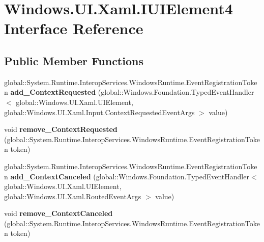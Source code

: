 \hypertarget{interface_windows_1_1_u_i_1_1_xaml_1_1_i_u_i_element4}{}\section{Windows.\+U\+I.\+Xaml.\+I\+U\+I\+Element4 Interface Reference}
\label{interface_windows_1_1_u_i_1_1_xaml_1_1_i_u_i_element4}
\subsection*{Public Member Functions}
\begin{DoxyCompactItemize}
\item 
\mbox{\label{interface_windows_1_1_u_i_1_1_xaml_1_1_i_u_i_element4_abe904f042597f814b0e82b6911018524}} 
global\+::\+System.\+Runtime.\+Interop\+Services.\+Windows\+Runtime.\+Event\+Registration\+Token {\bfseries add\+\_\+\+Context\+Requested} (global\+::\+Windows.\+Foundation.\+Typed\+Event\+Handler$<$ global\+::\+Windows.\+U\+I.\+Xaml.\+U\+I\+Element, global\+::\+Windows.\+U\+I.\+Xaml.\+Input.\+Context\+Requested\+Event\+Args $>$ value)
\item 
\mbox{\label{interface_windows_1_1_u_i_1_1_xaml_1_1_i_u_i_element4_abdaa8213b321663c768808ee50570eb8}} 
void {\bfseries remove\+\_\+\+Context\+Requested} (global\+::\+System.\+Runtime.\+Interop\+Services.\+Windows\+Runtime.\+Event\+Registration\+Token token)
\item 
\mbox{\label{interface_windows_1_1_u_i_1_1_xaml_1_1_i_u_i_element4_a9ade4191c6e4d4e8692b363604d2e6cf}} 
global\+::\+System.\+Runtime.\+Interop\+Services.\+Windows\+Runtime.\+Event\+Registration\+Token {\bfseries add\+\_\+\+Context\+Canceled} (global\+::\+Windows.\+Foundation.\+Typed\+Event\+Handler$<$ global\+::\+Windows.\+U\+I.\+Xaml.\+U\+I\+Element, global\+::\+Windows.\+U\+I.\+Xaml.\+Routed\+Event\+Args $>$ value)
\item 
\mbox{\label{interface_windows_1_1_u_i_1_1_xaml_1_1_i_u_i_element4_ac9d7657d497cc4bd420335a23752824f}} 
void {\bfseries remove\+\_\+\+Context\+Canceled} (global\+::\+System.\+Runtime.\+Interop\+Services.\+Windows\+Runtime.\+Event\+Registration\+Token token)

\end{DoxyCompactItemize}
